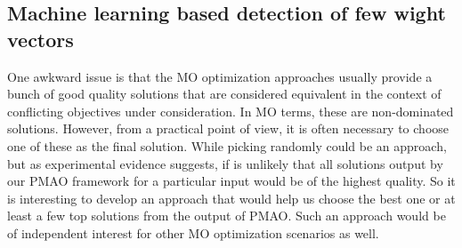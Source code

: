 \subsection{Machine learning based detection of few wight vectors}
One awkward issue is that the MO optimization approaches usually provide a bunch of good quality solutions that are considered equivalent in the context of conflicting objectives under consideration. In MO terms, these are non-dominated solutions. However, from a practical point of view, it is often necessary to choose one of these as the final solution. While picking randomly could be an approach, but as experimental evidence suggests, if is unlikely that all solutions output by our PMAO framework for a particular input would be of the highest quality. So it is interesting to develop an approach that would help us choose the best one or at least a few top solutions from the output of PMAO. Such an approach would be of independent interest for other MO optimization scenarios as well.

